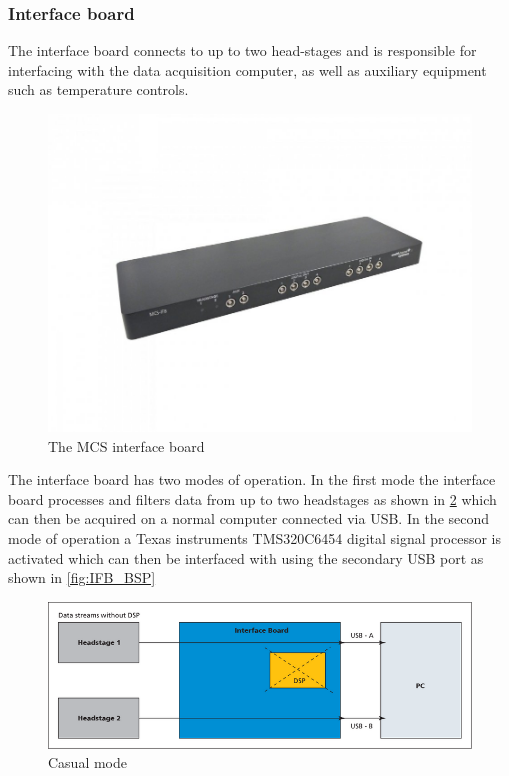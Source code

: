 \subsubsection{Interface board}
The interface board connects to up to two head-stages and is responsible for interfacing
with the data acquisition computer, as well as auxiliary equipment such as temperature
controls.
\begin{figure}[h!]
    \includegraphics[width=\linewidth]{images/MCS-IFB.jpg}
    \caption{The MCS interface board}
    \label{fig:neuron_anatomy}
\end{figure}
The interface board has two modes of operation.
In the first mode the interface board processes and filters data from up to two
headstages as shown in \ref{fig:IFB_regular} which can then be acquired on a normal
computer connected via USB.
In the second mode of operation a Texas instruments TMS320C6454 digital signal
processor is activated which can then be interfaced with using the secondary USB
port as shown in \ref{fig:IFB_BSP}
\begin{figure}[h!]
    \includegraphics[width=\linewidth]{images/regular_operation.png}
    \caption{Casual mode}
    \label{fig:IFB_regular}
\end{figure}
